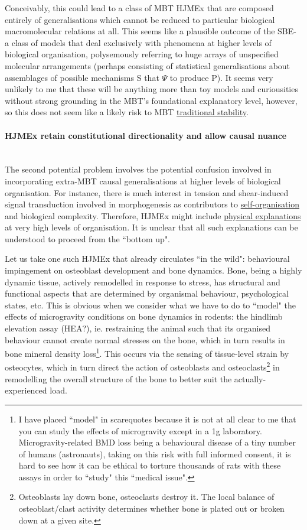   Conceivably, this could lead to a class of MBT HJMEx that are composed entirely of generalisations which cannot be reduced to particular biological macromolecular relations at all. This seems like a plausible outcome of the SBE- a class of models that deal exclusively with phenomena at higher levels of biological organisation, polysemously referring to huge arrays of unspecified molecular arrangements (perhaps consisting of statistical generalisations about assemblages of possible mechanisms S that $\Psi$ to produce P). It seems very unlikely to me that these will be anything more than toy models and curiousities without strong grounding in the MBT's foundational explanatory level, however, so this does not seem like a likely risk to MBT \hyperref[stability]{traditional stability}.   
 
 \paragraph{HJMEx retain constitutional directionality and allow causal nuance}\mbox{}\\
 
 The second potential problem involves the potential confusion involved in incorporating extra-MBT causal generalisations at higher levels of biological organisation. For instance, there is much interest in tension and shear-induced signal transduction involved in morphogenesis \cite[p.5]{Malagon2015} as contributors to \hyperref[emergence]{self-organisation} and biological complexity. Therefore, HJMEx might include \hyperref[physex]{physical explanations} at very high levels of organisation. It is unclear that all such explanations can be understood to proceed from the ``bottom up".
 
 Let us take one such HJMEx that already circulates ``in the wild": behavioural impingement on osteoblast development and bone dynamics. Bone, being a highly dynamic tissue, actively remodelled in response to stress, has structural and functional aspects that are determined by organismal behaviour, psychological states, etc. This is obvious when we consider what we have to do to ``model" the effects of microgravity conditions on bone dynamics in rodents: the hindlimb elevation assay (HEA?), ie. restraining the animal such that its organised behaviour cannot create normal stresses on the bone, which in turn results in bone mineral density loss\footnote{I have placed ``model" in scarequotes because it is not at all clear to me that you can study the effects of microgravity except in a 1g laboratory. Microgravity-related BMD loss being a behavioural disease of a tiny number of humans (astronauts), taking on this risk with full informed consent, it is hard to see how it can be ethical to torture thousands of rats with these assays in order to ``study" this ``medical issue".}. This occurs via the sensing of tissue-level strain by osteocytes, which in turn direct the action of osteoblasts and osteoclasts\footnote{Osteoblasts lay down bone, osteoclasts destroy it. The local balance of osteoblast/clast activity determines whether bone is plated out or broken down at a given site.} in remodelling the overall structure of the bone to better suit the actually-experienced load.

